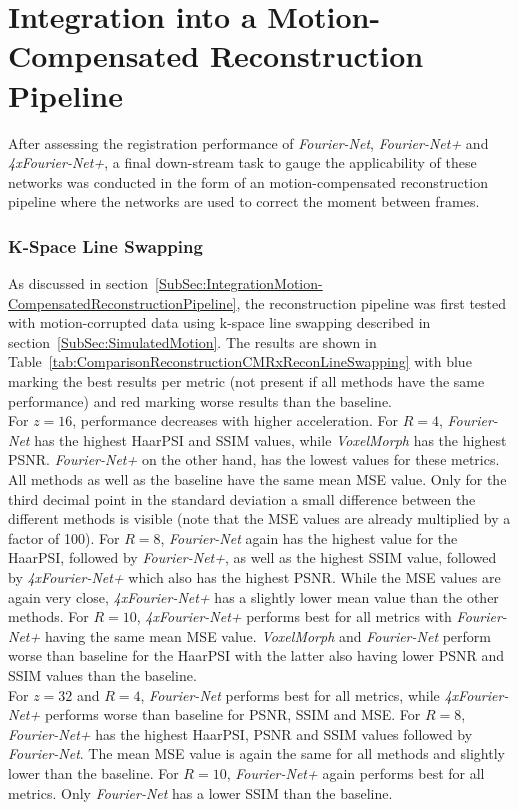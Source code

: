 \section{Integration into a Motion-Compensated Reconstruction Pipeline} \label{Sec:ResultsIntegrationMotion-CompensatedReconstructionPipeline}
After assessing the registration performance of \emph{Fourier-Net}, \emph{Fourier-Net+} and \emph{4xFourier-Net+}, a final down-stream task to gauge the applicability of these networks was conducted in the form of an motion-compensated reconstruction pipeline where the networks are used to correct the moment between frames.

\subsubsection{K-Space Line Swapping}
As discussed in section~\ref{SubSec:IntegrationMotion-CompensatedReconstructionPipeline}, the reconstruction pipeline was first tested with motion-corrupted data using k-space line swapping described in section~\ref{SubSec:SimulatedMotion}. The results are shown in Table~\ref{tab:ComparisonReconstructionCMRxReconLineSwapping} with blue marking the best results per metric (not present if all methods have the same performance) and red marking worse results than the baseline. \\
For $z=16$, performance decreases with higher acceleration. For $R=4$, \emph{Fourier-Net} has the highest HaarPSI and SSIM values, while \emph{VoxelMorph} has the highest PSNR. \emph{Fourier-Net+} on the other hand, has the lowest values for these metrics. All methods as well as the baseline have the same mean MSE value. Only for the third decimal point in the standard deviation a small difference between the different methods is visible (note that the MSE values are already multiplied by a factor of 100). %
For $R=8$, \emph{Fourier-Net} again has the highest value for the HaarPSI, followed by \emph{Fourier-Net+}, as well as the highest SSIM value, followed by \emph{4xFourier-Net+} which also has the highest PSNR. While the MSE values are again very close, \emph{4xFourier-Net+} has a slightly lower mean value than the other methods.%
For $R=10$, \emph{4xFourier-Net+} performs best for all metrics with \emph{Fourier-Net+} having the same mean MSE value. \emph{VoxelMorph} and \emph{Fourier-Net} perform worse than baseline for the HaarPSI with the latter also having lower PSNR and SSIM values than the baseline.\\
For $z=32$ and $R=4$, \emph{Fourier-Net} performs best for all metrics, while \emph{4xFourier-Net+} performs worse than baseline for PSNR, SSIM and MSE. For $R=8$, \emph{Fourier-Net+} has the highest HaarPSI, PSNR and SSIM values followed by \emph{Fourier-Net}. The mean MSE value is again the same for all methods and slightly lower than the baseline. For $R=10$, \emph{Fourier-Net+} again performs best for all metrics. Only \emph{Fourier-Net} has a lower SSIM than the baseline.

